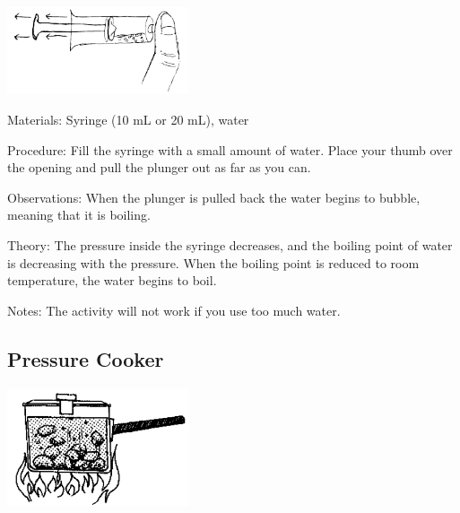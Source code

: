 \begin{multicols}{2}
\begin{center}
\includegraphics[width=0.4\textwidth]{./img/boiling-room-temp.png}
\end{center}

\begin{description*}
\item[Materials:]{Syringe (10 mL or 20 mL), water}
\item[Procedure:]{Fill the syringe with a small amount of water. Place your thumb over the opening and pull the plunger out as far as you can.}
\item[Observations:]{When the plunger is pulled back the water begins to bubble, meaning that it is boiling.}
\item[Theory:]{The pressure inside the syringe decreases, and the boiling point of water is decreasing with the pressure. When the boiling point is reduced to room temperature, the water begins to boil.}
\item[Notes:]{The activity will not work if you use too much water.}
\end{description*}

\subsection{Pressure Cooker}

\begin{center}
\includegraphics[width=0.4\textwidth]{./img/source/pressure-cooker.png}
\end{center}


\end{multicols}
